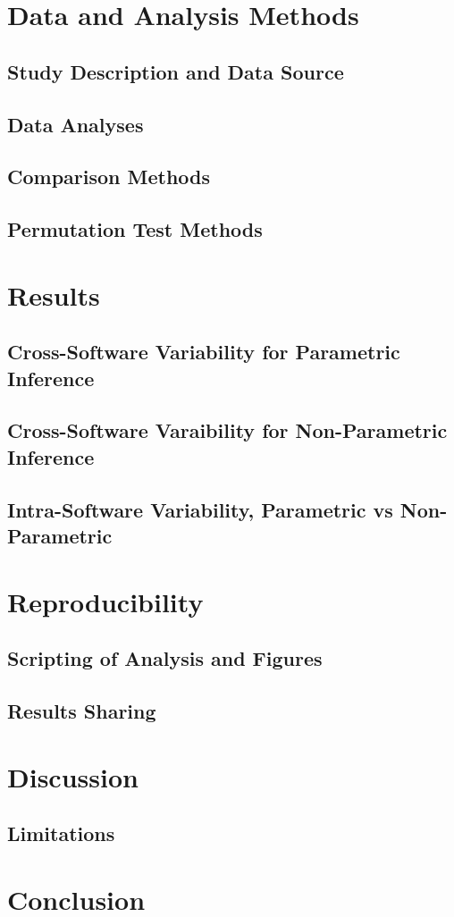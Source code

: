 \section{Data and Analysis Methods}

\subsection{Study Description and Data Source}

\subsection{Data Analyses}

\subsection{Comparison Methods}

\subsection{Permutation Test Methods}

\section{Results}

\subsection{Cross-Software Variability for Parametric Inference}

\subsection{Cross-Software Varaibility for Non-Parametric Inference}

\subsection{Intra-Software Variability, Parametric vs Non-Parametric}

\section{Reproducibility}

\subsection{Scripting of Analysis and Figures}

\subsection{Results Sharing}

\section{Discussion}

\subsection{Limitations}

\section{Conclusion}
